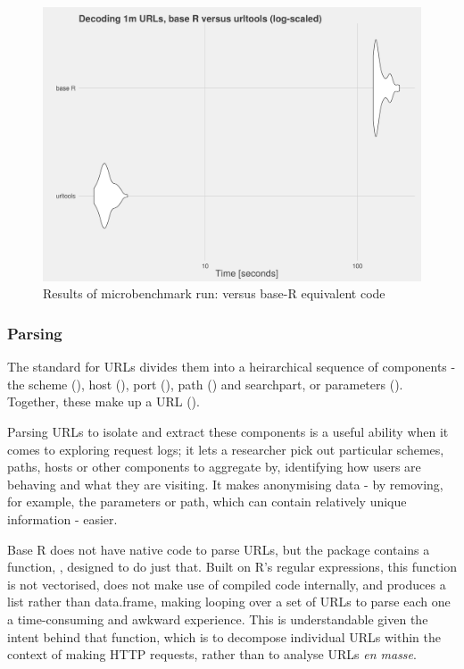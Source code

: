 \begin{figure}[h]
    \centering
    \includegraphics[scale=0.4]{decoding_benchmarks}
    \caption{Results of microbenchmark run:  versus base-R equivalent code}
\end{figure}

\subsubsection{Parsing}\label{parsing}

The standard for URLs \citep{RFC1738} divides them into a heirarchical
sequence of components - the scheme (), host
(), port (), path
() and searchpart, or parameters
(). Together, these make up a URL
\linebreak ().

Parsing URLs to isolate and extract these components is a useful ability
when it comes to exploring request logs; it lets a researcher pick out
particular schemes, paths, hosts or other components to aggregate by,
identifying how users are behaving and what they are visiting. It makes
anonymising data - by removing, for example, the parameters or path,
which can contain relatively unique information - easier.

Base R does not have native code to parse URLs, but the 
package \citep{httr} contains a function, , designed to
do just that. Built on R's regular expressions, this function is not
vectorised, does not make use of compiled code internally, and produces
a list rather than data.frame, making looping over a set of URLs to
parse each one a time-consuming and awkward experience. This is
understandable given the intent behind that function, which is to
decompose individual URLs within the context of making HTTP requests,
rather than to analyse URLs \emph{en masse}.

